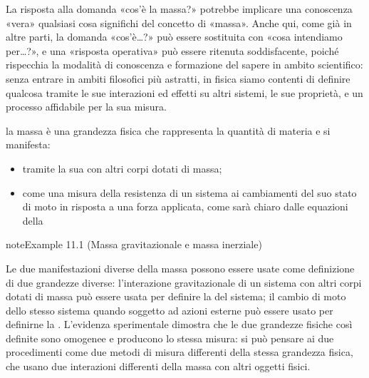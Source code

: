 \documentclass[letterpaper,10pt,italian]{jupyterBook}
\begin{document}
\sphinxAtStartPar
{}%
\begin{footnote}[1]\sphinxAtStartFootnote
La risposta alla domanda «cos’è la massa?» potrebbe implicare una conoscenza «vera» \sphinxhyphen{} qualsiasi cosa significhi \sphinxhyphen{} del concetto di «massa». Anche qui, come già in altre parti, la domanda «cos’è…?» può essere sostituita con «cosa intendiamo per…?», e una «risposta operativa» può essere ritenuta soddisfacente, poiché rispecchia la modalità di conoscenza e formazione del sapere in ambito scientifico: senza entrare in ambiti filosofici più astratti, in fisica siamo contenti di definire qualcosa tramite le sue interazioni ed effetti su altri sistemi, le sue proprietà, e un processo affidabile per la sua misura.
%
\end{footnote} la massa è una grandezza fisica che rappresenta la quantità di materia e si manifesta:
\begin{itemize}
\item {} 
\sphinxAtStartPar
tramite la sua {\hyperref[\detokenize{ch/mechanics/actions-examples:physics-hs-mechanics-actions-gravitation}]{}} con altri corpi dotati di massa;

\item {} 
\sphinxAtStartPar
come una misura della resistenza di un sistema ai cambiamenti del suo stato di moto in risposta a una forza applicata, come sarà chiaro dalle equazioni della {\hyperref[\detokenize{ch/mechanics/dynamics:physics-hs-mechanics-dynamics}]{}}

\end{itemize}
\label{ch/mechanics/inertia:example-0}
\begin{sphinxadmonition}{note}{Example 11.1 (Massa gravitazionale e massa inerziale)}



\sphinxAtStartPar
Le due manifestazioni diverse della massa possono essere usate come definizione di due grandezze diverse: l’interazione gravitazionale di un sistema con altri corpi dotati di massa può essere usata per definire la  del sistema; il cambio di moto dello stesso sistema quando soggetto ad azioni esterne può essere usato per definirne la . L’evidenza sperimentale dimostra che le due grandezze fisiche così definite sono omogenee e producono lo stessa misura: si può pensare ai due procedimenti come due metodi di misura differenti della stessa grandezza fisica, che usano due interazioni differenti della massa con altri oggetti fisici.
\end{sphinxadmonition}
\end{document}
